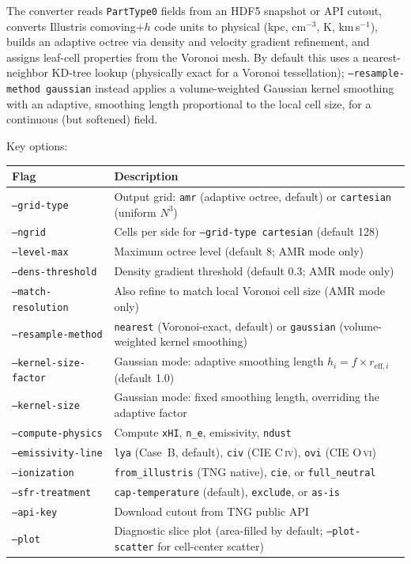 \documentclass[english,a4paper]{my_memo}
\begin{document}
The converter reads \texttt{PartType0} fields from an HDF5 snapshot or
API cutout, converts Illustris comoving+$h$ code units to physical
(kpc, cm$^{-3}$, K, km\,s$^{-1}$), builds an adaptive octree via
density and velocity gradient refinement, and assigns leaf-cell
properties from the Voronoi mesh.  By default this uses a
nearest-neighbor KD-tree lookup (physically exact for a Voronoi
tessellation); \texttt{--resample-method gaussian} instead applies a
volume-weighted Gaussian kernel smoothing with an adaptive,
smoothing length proportional to the local cell size, for a continuous (but softened) field.

Key options:

\begin{center}
\begin{tabular}{lp{9.5cm}}
\toprule
\textbf{Flag} & \textbf{Description} \\
\midrule
\texttt{--grid-type}       & Output grid: \texttt{amr} (adaptive octree, default) or \texttt{cartesian} (uniform $N^3$) \\
\texttt{--ngrid}           & Cells per side for \texttt{--grid-type cartesian} (default 128) \\
\texttt{--level-max}       & Maximum octree level (default 8; AMR mode only) \\
\texttt{--dens-threshold}  & Density gradient threshold (default 0.3; AMR mode only) \\
\texttt{--match-resolution}& Also refine to match local Voronoi cell size (AMR mode only) \\
\texttt{--resample-method} & \texttt{nearest} (Voronoi-exact, default) or \texttt{gaussian} (volume-weighted kernel smoothing) \\
\texttt{--kernel-size-factor} & Gaussian mode: adaptive smoothing length $h_i = f \times r_{\mathrm{eff},i}$ (default 1.0) \\
\texttt{--kernel-size}     & Gaussian mode: fixed smoothing length, overriding the adaptive factor \\
\texttt{--compute-physics} & Compute \texttt{xHI}, \texttt{n\_e}, emissivity, \texttt{ndust} \\
\texttt{--emissivity-line} & \texttt{lya} (Case~B, default), \texttt{civ} (CIE C\,\textsc{iv}), \texttt{ovi} (CIE O\,\textsc{vi}) \\
\texttt{--ionization}      & \texttt{from\_illustris} (TNG native), \texttt{cie}, or \texttt{full\_neutral} \\
\texttt{--sfr-treatment}   & \texttt{cap-temperature} (default), \texttt{exclude}, or \texttt{as-is} \\
\texttt{--api-key}         & Download cutout from TNG public API \\
\texttt{--plot}            & Diagnostic slice plot (area-filled by default; \texttt{--plot-scatter} for cell-center scatter) \\
\bottomrule
\end{tabular}
\end{center}
\end{document}
